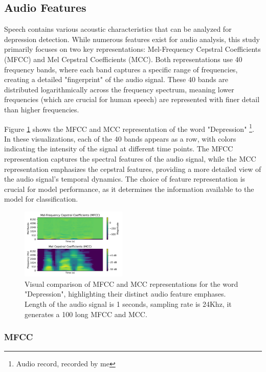 \subsection{Audio Features}
Speech contains various acoustic characteristics that can be analyzed for depression detection. While numerous features exist for audio analysis, this study primarily focuses on two key representations: Mel-Frequency Cepstral Coefficients (MFCC) and Mel Cepstral Coefficients (MCC). Both representations use 40 frequency bands, where each band captures a specific range of frequencies, creating a detailed "fingerprint" of the audio signal. These 40 bands are distributed logarithmically across the frequency spectrum, meaning lower frequencies (which are crucial for human speech) are represented with finer detail than higher frequencies.

Figure \ref{fig:mfcc_mcc} shows the MFCC and MCC representation of the word "Depression" \footnote{Audio record, recorded by me}. In these visualizations, each of the 40 bands appears as a row, with colors indicating the intensity of the signal at different time points. The MFCC representation captures the spectral features of the audio signal, while the MCC representation emphasizes the cepstral features, providing a more detailed view of the audio signal's temporal dynamics. The choice of feature representation is crucial for model performance, as it determines the information available to the model for classification.

\begin{figure}[H]
    \centering
    \includegraphics[width=0.45\textwidth]{vis_pdf/mfcc_mcc_comparison.pdf} %
    \caption{Visual comparison of MFCC and MCC representations for the word "Depression", highlighting their distinct audio feature emphases. Length of the audio signal is 1 seconds, sampling rate is 24Khz, it generates a 100 long MFCC and MCC.}
    \label{fig:mfcc_mcc}
\end{figure}

\subsubsection{MFCC}

